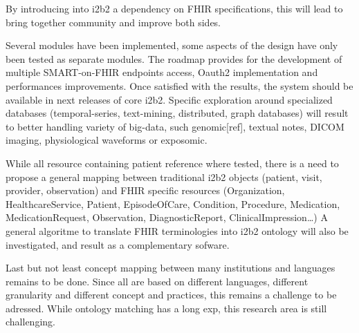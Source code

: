 \documentclass{amia}
\begin{document}
By introducing into i2b2 a dependency on FHIR specifications, this will lead to bring together community and improve both sides.

Several modules have been implemented, some aspects of the design have only been tested as separate modules.
The roadmap provides for the development of multiple SMART-on-FHIR endpoints access, Oauth2 implementation and performances improvements. Once satisfied with the results, the system should be available in next releases of core i2b2. Specific exploration around specialized databases (temporal-series, text-mining, distributed, graph databases) will result to better handling variety of big-data, such genomic[ref], textual notes, DICOM imaging, physiological waveforms or exposomic.

While all resource containing patient reference where tested, there is a need to propose a general mapping between traditional i2b2 objects (patient, visit, provider, observation) and FHIR specific resources (Organization, HealthcareService, Patient, EpisodeOfCare, Condition, Procedure, Medication, MedicationRequest, Observation, DiagnosticReport, ClinicalImpression\ldots)
A general algoritme to translate FHIR terminologies into i2b2 ontology will also be investigated, and result as a complementary sofware.

Last but not least concept mapping between many institutions and languages remains to be done. Since all are based on different languages, different granularity and different concept and practices, this remains a challenge to be adressed. While ontology matching has a long exp, this research area is still challenging.
\end{document}
